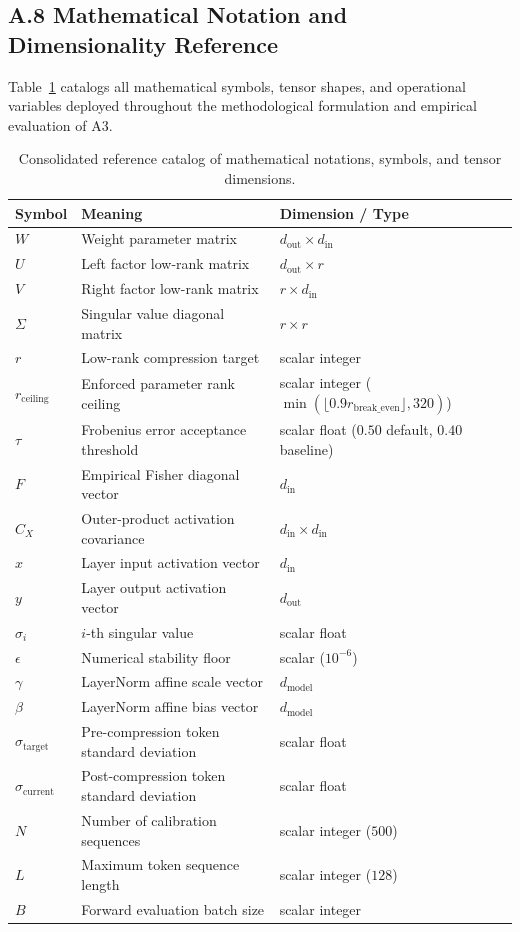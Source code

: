 \subsection{A.8 Mathematical Notation and Dimensionality Reference}
\label{sec:app_notation}

Table~\ref{tab:app_notation_summary} catalogs all mathematical symbols, tensor shapes, and operational variables deployed throughout the methodological formulation and empirical evaluation of A3.

\begin{table}[H]
\centering
\small
\begin{tabular}{lll}
\toprule
\textbf{Symbol} & \textbf{Meaning} & \textbf{Dimension / Type} \\
\midrule
$W$ & Weight parameter matrix & $d_\text{out} \times d_\text{in}$ \\
$U$ & Left factor low-rank matrix & $d_\text{out} \times r$ \\
$V$ & Right factor low-rank matrix & $r \times d_\text{in}$ \\
$\Sigma$ & Singular value diagonal matrix & $r \times r$ \\
$r$ & Low-rank compression target & scalar integer \\
$r_{\mathrm{ceiling}}$ & Enforced parameter rank ceiling & scalar integer ($\min(\lfloor 0.9 r_{\mathrm{break\_even}}\rfloor, 320)$) \\
$\tau$ & Frobenius error acceptance threshold & scalar float ($0.50$ default, $0.40$ baseline) \\
$F$ & Empirical Fisher diagonal vector & $d_\text{in}$ \\
$C_X$ & Outer-product activation covariance & $d_\text{in} \times d_\text{in}$ \\
$x$ & Layer input activation vector & $d_\text{in}$ \\
$y$ & Layer output activation vector & $d_\text{out}$ \\
$\sigma_i$ & $i$-th singular value & scalar float \\
$\epsilon$ & Numerical stability floor & scalar ($10^{-6}$) \\
$\gamma$ & LayerNorm affine scale vector & $d_\text{model}$ \\
$\beta$ & LayerNorm affine bias vector & $d_\text{model}$ \\
$\sigma_\text{target}$ & Pre-compression token standard deviation & scalar float \\
$\sigma_\text{current}$ & Post-compression token standard deviation & scalar float \\
$N$ & Number of calibration sequences & scalar integer ($500$) \\
$L$ & Maximum token sequence length & scalar integer ($128$) \\
$B$ & Forward evaluation batch size & scalar integer \\
\bottomrule
\end{tabular}
\caption{Consolidated reference catalog of mathematical notations, symbols, and tensor dimensions.}
\label{tab:app_notation_summary}
\end{table}

